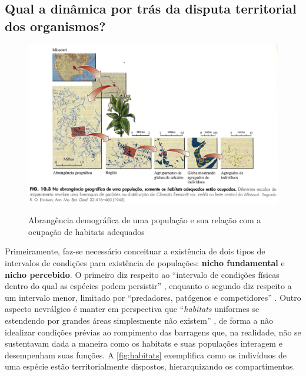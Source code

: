 \documentclass[
article,			%
11pt,				%
oneside,			%
a4paper,			%
english,			%
brazil,				%
sumario=tradicional
]{abntex2}
\begin{document}
	\subsection{Qual a dinâmica por trás da disputa territorial dos organismos?}
	
	\begin{figure}[htb]
		\centering
		\caption{Abrangência demográfica de uma população e sua relação com a ocupação de habitats adequados}
		\includegraphics[width=1.0\linewidth]{img/rick_194_01.png}
		\label{fig:habitats}
	\end{figure}
	
	Primeiramente, faz-se necessário conceituar a existência de dois tipos de intervalos de condições para existência de populações: \textbf{nicho fundamental} e \textbf{nicho percebido}. O primeiro diz respeito ao ``intervalo de condições físicas dentro do qual as espécies podem persistir'' \cite[p.177]{ricklefs2003a}, enquanto o segundo diz respeito a um intervalo menor, limitado por ``predadores, patógenos e competidores'' \cite[p.177]{ricklefs2003a}. Outro aspecto nevrálgico é manter em perspectiva que ``\textit{habitats} uniformes se estendendo por grandes áreas simplesmente não existem'' \cite[p.177]{ricklefs2003a}, de forma a não idealizar condições prévias ao rompimento das barragens que, na realidade, não se sustentavam dada a maneira como os habitats e suas populações interagem e desempenham suas funções. A \autoref{fig:habitats} exemplifica como os indivíduos de uma espécie estão territorialmente dispostos, hierarquizando os compartimentos.
	
\end{document}

